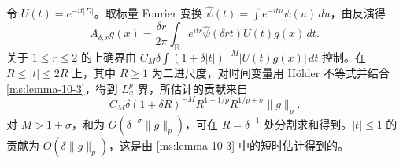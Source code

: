 令 $U(t)=e^{-it|D|}$。取标量 Fourier 变换 $\widehat\psi(t)=\int e^{-itu}\psi(u)\,du$，由反演得
\[
 A_{\delta,r}g(x)=\frac{\delta r}{2\pi}
 \int_{\mathbb R}e^{itr}\widehat\psi(\delta rt)U(t)g(x)\,dt.
\]
关于 $1\le r\le2$ 的上确界由 $C_M\delta\int(1+\delta|t|)^{-M}|U(t)g(x)|\,dt$ 控制。在 $R\le|t|\le2R$ 上，其中 $R\ge1$ 为二进尺度，对时间变量用 Hölder 不等式并结合 \ref{ms:lemma-10-3}，得到 $L_x^p$ 界，所估计的贡献来自
\[
 C_M\delta(1+\delta R)^{-M}R^{1-1/p}R^{1/p+\sigma}\|g\|_p.
\]
对 $M>1+\sigma$，和为 $O(\delta^{-\sigma}\|g\|_p)$，可在 $R=\delta^{-1}$ 处分割求和得到。$|t|\le1$ 的贡献为 $O(\delta\|g\|_p)$，这是由 \ref{ms:lemma-10-3} 中的短时估计得到的。
